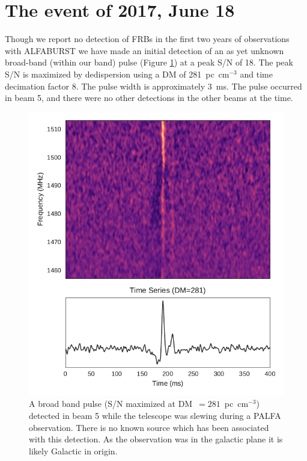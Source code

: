 \documentclass[a4paper,fleqn,usenatbib]{mnras}
\begin{document}

\section{The event of 2017, June 18}
\label{sec:18062017}

Though we report no detection of FRBs in the first two years of observations
with ALFABURST we have made an initial detection of an as yet unknown broad-band
(within our band) pulse (Figure \ref{fig:D20170618_spectrum}) at a peak S/N of
18. The peak S/N is maximized by dedispersion using a DM of 281~pc~cm$^{-3}$ and
time decimation factor 8. The pulse width is approximately 3~ms. The pulse
occurred in beam 5, and there were no other detections in the other beams at the
time.

\begin{figure}
    \includegraphics[width=1.0\linewidth]{figures/Beam5_fb_D20170618T005616_buffer2_spectrum.pdf}
    \caption{A broad band pulse (S/N maximized at DM~$=281$~pc~cm$^{-3}$)
    detected in beam 5 while the telescope was slewing during a PALFA
    observation. There is no known source which has been associated with this
    detection. As the observation was in the galactic plane it is likely
    Galactic in origin.
    }
    \label{fig:D20170618_spectrum}
\end{figure}
\end{document}
